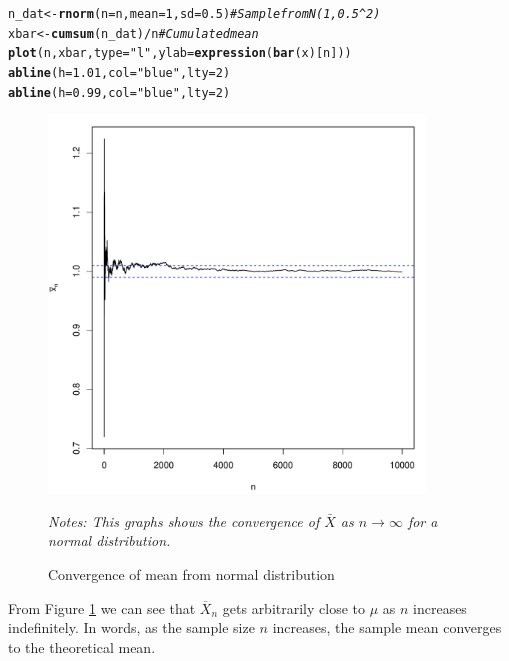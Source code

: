 \documentclass[english,12pt]{book}\usepackage[]{graphicx}\usepackage[]{xcolor}
\makeatletter
\newcommand{\hlnum}[1]{\textcolor[rgb]{0.686,0.059,0.569}{#1}}%
\newcommand{\hlstr}[1]{\textcolor[rgb]{0.192,0.494,0.8}{#1}}%
\newcommand{\hlcom}[1]{\textcolor[rgb]{0.678,0.584,0.686}{\textit{#1}}}%
\newcommand{\hlopt}[1]{\textcolor[rgb]{0,0,0}{#1}}%
\newcommand{\hlstd}[1]{\textcolor[rgb]{0.345,0.345,0.345}{#1}}%
\newcommand{\hlkwb}[1]{\textcolor[rgb]{0.69,0.353,0.396}{#1}}%
\newcommand{\hlkwc}[1]{\textcolor[rgb]{0.333,0.667,0.333}{#1}}%
\newcommand{\hlkwd}[1]{\textcolor[rgb]{0.737,0.353,0.396}{\textbf{#1}}}%
\newenvironment{kframe}{%
 \def\at@end@of@kframe{}%
 \ifinner\ifhmode%
  \def\at@end@of@kframe{\end{minipage}}%
  \begin{minipage}{\columnwidth}%
 \fi\fi%
 \def\FrameCommand##1{\hskip\@totalleftmargin \hskip-\fboxsep
 \colorbox{shadecolor}{##1}\hskip-\fboxsep
     \hskip-\linewidth \hskip-\@totalleftmargin \hskip\columnwidth}%
 \MakeFramed {\advance\hsize-\width
   \@totalleftmargin\z@ \linewidth\hsize
   \@setminipage}}%
 {\par\unskip\endMakeFramed%
 \at@end@of@kframe}
\newenvironment{knitrout}{}{} %
\makeatother
\begin{document}
\begin{example}
\begin{knitrout}
\begin{kframe}
\begin{alltt}
\hlstd{n_dat} \hlkwb{<-} \hlkwd{rnorm}\hlstd{(}\hlkwc{n} \hlstd{= n,} \hlkwc{mean} \hlstd{=} \hlnum{1}\hlstd{,} \hlkwc{sd} \hlstd{=} \hlnum{0.5}\hlstd{)} \hlcom{# Sample from N(1, 0.5^2)}
\hlstd{xbar} \hlkwb{<-} \hlkwd{cumsum}\hlstd{(n_dat)} \hlopt{/}  \hlstd{n}                \hlcom{# Cumulated mean}
\hlkwd{plot}\hlstd{(n, xbar,} \hlkwc{type} \hlstd{=} \hlstr{"l"}\hlstd{,} \hlkwc{ylab} \hlstd{=} \hlkwd{expression}\hlstd{(}\hlkwd{bar}\hlstd{(x)[n]))}
\hlkwd{abline}\hlstd{(}\hlkwc{h} \hlstd{=} \hlnum{1.01}\hlstd{,} \hlkwc{col} \hlstd{=} \hlstr{"blue"}\hlstd{,} \hlkwc{lty} \hlstd{=} \hlnum{2}\hlstd{)}
\hlkwd{abline}\hlstd{(}\hlkwc{h} \hlstd{=} \hlnum{0.99}\hlstd{,} \hlkwc{col} \hlstd{=} \hlstr{"blue"}\hlstd{,} \hlkwc{lty} \hlstd{=} \hlnum{2}\hlstd{)}
\end{alltt}
\end{kframe}
\end{knitrout}


\begin{figure}[H]
  \caption{Convergence of mean from normal distribution}
    \label{fig:CLTnormal}
        \centering
    \begin{minipage}{.9\linewidth}
\begin{knitrout}
\color{fgcolor}

{\centering \includegraphics[width=10cm,height=10cm]{figure/CLT-normalplot-1} 

}


\end{knitrout}
\footnotesize
		\emph{Notes: This graphs shows the convergence of $\bar{X}$ as $n\to\infty$ for a normal distribution.}
	\end{minipage}
\end{figure}

From Figure \ref{fig:CLTnormal} we can see that $\overline{X}_n$ gets arbitrarily close to $\mu$ as $n$ increases indefinitely. In words, as the sample size $n$ increases, the sample mean converges to the theoretical mean. 
\end{example}
\end{document}
